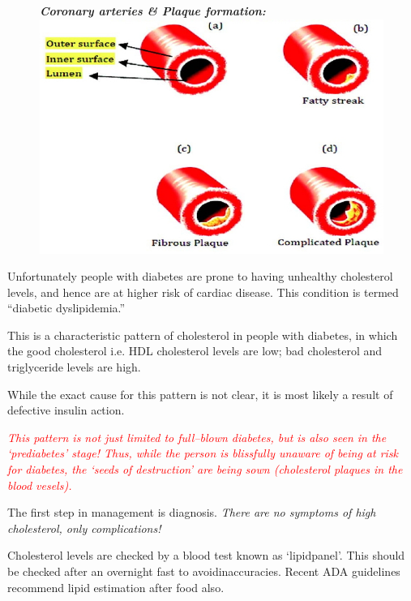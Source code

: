 \begin{figure}[h]
\centering
\textbf{\textit{Coronary arteries \& Plaque formation:}}\\
\includegraphics[scale=1.9]{images/044.jpg}
\end{figure}

Unfortunately people with diabetes are prone to having unhealthy cholesterol levels, and hence are at higher risk of cardiac disease. This condition is termed “diabetic dyslipidemia.”


This is a characteristic pattern of cholesterol in people with diabetes, in which the good cholesterol i.e. HDL cholesterol levels are low; bad cholesterol and triglyceride levels are high.

While the exact cause for this pattern is not clear, it is most likely a result of defective insulin action.

\textcolor{red}{\textit{This pattern is not just limited to full–blown diabetes, but is also seen in the ‘prediabetes’ stage! Thus, while the person is blissfully unaware of being at risk for diabetes, the ‘seeds of destruction’ are being sown (cholesterol plaques in the blood vesels).}}


The first step in management is diagnosis. \textit{There are no symptoms of high cholesterol, only complications!}

Cholesterol levels are checked by a blood test known as ‘lipid\break panel’. This should be checked after an overnight fast to avoid\break inaccuracies. Recent ADA guidelines recommend lipid estimation after food also.

